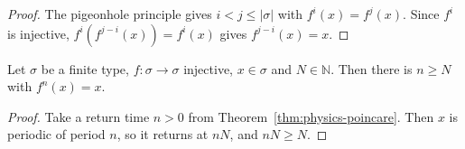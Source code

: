 \begin{proof}
  \leanok
  The pigeonhole principle gives $i < j \le |\sigma|$ with $f^{i}(x) = f^{j}(x)$. Since
  $f^{i}$ is injective, $f^{i}(f^{j-i}(x)) = f^{i}(x)$ gives $f^{j-i}(x) = x$.
\end{proof}

\begin{theorem}
  \label{thm:physics-poincare-infinitas}
  \leanok
  Let $\sigma$ be a finite type, $f : \sigma \to \sigma$ injective, $x \in \sigma$ and
  $N \in \mathbb{N}$. Then there is $n \ge N$ with $f^{n}(x) = x$.
\end{theorem}

\begin{proof}
  \leanok
  Take a return time $n > 0$ from Theorem~\ref{thm:physics-poincare}. Then $x$ is periodic of period
  $n$, so it returns at $nN$, and $nN \ge N$.
\end{proof}
